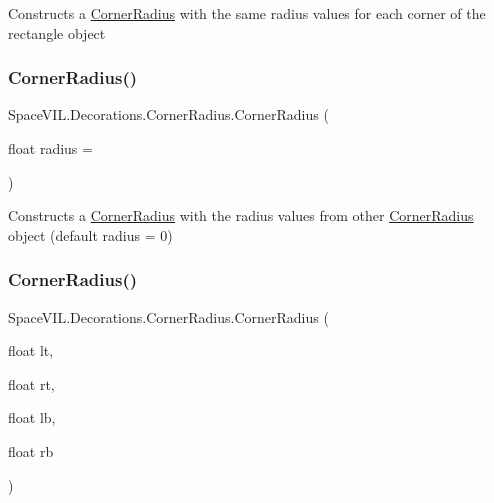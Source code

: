Constructs a \mbox{\hyperlink{class_space_v_i_l_1_1_decorations_1_1_corner_radius}{Corner\+Radius}} with the same radius values for each corner of the rectangle object 

\mbox{\label{class_space_v_i_l_1_1_decorations_1_1_corner_radius_a77ef3851682dba201957ebd8c4ae1e93}} 
\subsubsection{\texorpdfstring{Corner\+Radius()}{CornerRadius()}\hspace{0.1cm}{\footnotesize\ttfamily [2/3]}}
{\footnotesize\ttfamily Space\+V\+I\+L.\+Decorations.\+Corner\+Radius.\+Corner\+Radius (\begin{DoxyParamCaption}\item[{float}]{radius = {} }\end{DoxyParamCaption})}



Constructs a \mbox{\hyperlink{class_space_v_i_l_1_1_decorations_1_1_corner_radius}{Corner\+Radius}} with the radius values from other \mbox{\hyperlink{class_space_v_i_l_1_1_decorations_1_1_corner_radius}{Corner\+Radius}} object (default radius = 0) 

\mbox{\label{class_space_v_i_l_1_1_decorations_1_1_corner_radius_a486555a2befbaf3cbe29039669e95b99}} 
\subsubsection{\texorpdfstring{Corner\+Radius()}{CornerRadius()}\hspace{0.1cm}{\footnotesize\ttfamily [3/3]}}
{\footnotesize\ttfamily Space\+V\+I\+L.\+Decorations.\+Corner\+Radius.\+Corner\+Radius (\begin{DoxyParamCaption}\item[{float}]{lt,  }\item[{float}]{rt,  }\item[{float}]{lb,  }\item[{float}]{rb }\end{DoxyParamCaption})}



